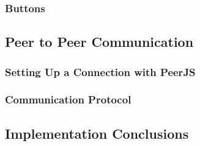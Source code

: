 \subsubsection{Buttons}


\subsection{Peer to Peer Communication}

\subsubsection{Setting Up a Connection with PeerJS}

\subsubsection{Communication Protocol}

\subsection{Implementation Conclusions}

\clearpage
